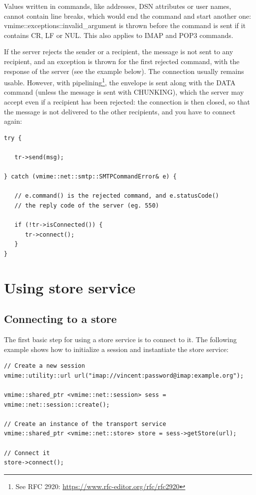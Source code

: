 Values written in commands, like addresses, DSN attributes or user names,
cannot contain line breaks, which would end the command and start another
one: {\vcode vmime::exceptions::invalid\_argument} is thrown before the
command is sent if it contains CR, LF or NUL. This also applies to IMAP and
POP3 commands.

If the server rejects the sender or a recipient, the message is not sent to
any recipient, and an exception is thrown for the first rejected command, with
the response of the server (see the example below). The connection usually
remains usable. However, with
pipelining\footnote{See RFC 2920: \url{https://www.rfc-editor.org/rfc/rfc2920}},
the envelope is sent along with the DATA command (unless the message is sent
with CHUNKING), which the server may accept even if a recipient has been
rejected: the connection is then closed, so that the message is not delivered
to the other recipients, and you have to connect again:

\begin{lstlisting}
try {

   tr->send(msg);

} catch (vmime::net::smtp::SMTPCommandError& e) {

   // e.command() is the rejected command, and e.statusCode()
   // the reply code of the server (eg. 550)

   if (!tr->isConnected()) {
      tr->connect();
   }
}
\end{lstlisting}


\section{Using store service}

\subsection{Connecting to a store\label{net-store-connect}} %

The first basic step for using a store service is to connect to it. The
following example shows how to initialize a session and instantiate the
store service:

\begin{lstlisting}[caption={Connecting to a store service}]
// Create a new session
vmime::utility::url url("imap://vincent:password@imap:example.org");

vmime::shared_ptr <vmime::net::session> sess = vmime::net::session::create();

// Create an instance of the transport service
vmime::shared_ptr <vmime::net::store> store = sess->getStore(url);

// Connect it
store->connect();
\end{lstlisting}

